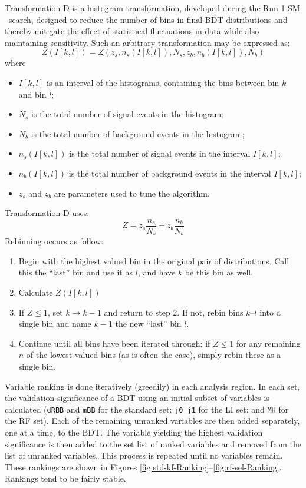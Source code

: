 Transformation D is a histogram transformation, developed during the Run 1 SM \vhbb\, search, designed to reduce the number of bins in final BDT distributions and thereby mitigate the effect of statistical fluctuations in data while also maintaining sensitivity.  Such an arbitrary transformation may be expressed as:
\begin{equation}
Z\left(I\left[k,l\right]\right) = Z\left(z_s,n_s\left(I\left[k,l\right]\right),N_s,z_b,n_b\left(I\left[k,l\right]\right),N_b\right)
\end{equation}
where
\begin{itemize}
\item $I[k,l]$ is an interval of the histograms, containing the bins between bin $k$ and bin $l$;
\item $N_{s}$ is the total number of signal events in the histogram;
\item $N_{b}$ is the total number of background events in the histogram;
\item $n_{s}(I[k,l])$ is the total number of signal events in the interval $I[k,l]$;
\item $n_{b}(I[k,l])$ is the total number of background events in the interval $I[k,l]$;
\item $z_{s}$ and $z_{b}$ are parameters used to tune the algorithm.
\end{itemize}
Transformation D uses:
\begin{equation}
Z = z_{s}\frac{n_{s}}{N_{s}} + z_{b}\frac{n_{b}}{N_{b}}
\end{equation}
Rebinning occurs as follow:
\begin{enumerate}
\item Begin with the highest valued bin in the original pair of distributions.  Call this the ``last'' bin and use it as $l$, and have $k$ be this bin as well.
\item Calculate $Z\left(I\left[k,l\right]\right)$
\item If $Z\le1$, set $k\to k-1$ and return to step 2.  If not, rebin bins $k$--$l$ into a single bin and name $k-1$ the new ``last'' bin $l$.
\item Continue until all bins have been iterated through; if $Z\le1$ for any remaining $n$ of the lowest-valued bins (as is often the case), simply rebin these as a single bin.
\end{enumerate}

Variable ranking is done iteratively (greedily) in each analysis region.  In each set, the validation significance of a BDT using an initial subset of variables is calculated (\texttt{dRBB} and \texttt{mBB} for the standard set; \texttt{j0\_j1} for the LI set; and \texttt{MH} for the RF set).  Each of the remaining unranked variables are then added separately, one at a time, to the BDT.  The variable yielding the highest validation significance is then added to the set list of ranked variables and removed from the list of unranked variables.  This process is repeated until no variables remain.  These rankings are shown in Figures \ref{fig:std-kf-Ranking}--\ref{fig:rf-sel-Ranking}.  Rankings tend to be fairly stable.

